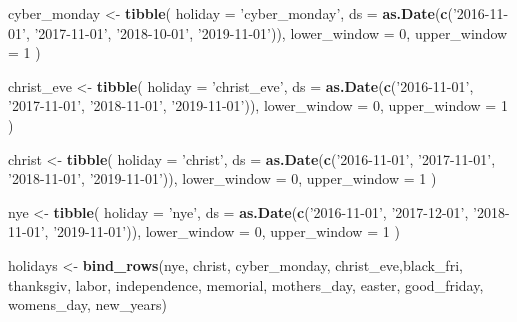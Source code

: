 \documentclass[]{article}
\newenvironment{Shaded}{\begin{snugshade}}{\end{snugshade}}
\newcommand{\KeywordTok}[1]{\textcolor[rgb]{0.13,0.29,0.53}{\textbf{{#1}}}}
\newcommand{\DataTypeTok}[1]{\textcolor[rgb]{0.13,0.29,0.53}{{#1}}}
\newcommand{\DecValTok}[1]{\textcolor[rgb]{0.00,0.00,0.81}{{#1}}}
\newcommand{\StringTok}[1]{\textcolor[rgb]{0.31,0.60,0.02}{{#1}}}
\newcommand{\NormalTok}[1]{{#1}}
\begin{document}
\begin{Shaded}
\begin{Highlighting}[]
\NormalTok{cyber_monday <-}\StringTok{ }\KeywordTok{tibble}\NormalTok{(}
  \DataTypeTok{holiday =} \StringTok{'cyber_monday'}\NormalTok{,}
  \DataTypeTok{ds =} \KeywordTok{as.Date}\NormalTok{(}\KeywordTok{c}\NormalTok{(}\StringTok{'2016-11-01'}\NormalTok{, }\StringTok{'2017-11-01'}\NormalTok{, }\StringTok{'2018-10-01'}\NormalTok{,}
                 \StringTok{'2019-11-01'}\NormalTok{)),}
  \DataTypeTok{lower_window =} \DecValTok{0}\NormalTok{,}
  \DataTypeTok{upper_window =} \DecValTok{1}
\NormalTok{)}

\NormalTok{christ_eve <-}\StringTok{ }\KeywordTok{tibble}\NormalTok{(}
  \DataTypeTok{holiday =} \StringTok{'christ_eve'}\NormalTok{,}
  \DataTypeTok{ds =} \KeywordTok{as.Date}\NormalTok{(}\KeywordTok{c}\NormalTok{(}\StringTok{'2016-11-01'}\NormalTok{, }\StringTok{'2017-11-01'}\NormalTok{, }\StringTok{'2018-11-01'}\NormalTok{,}
                 \StringTok{'2019-11-01'}\NormalTok{)),}
  \DataTypeTok{lower_window =} \DecValTok{0}\NormalTok{,}
  \DataTypeTok{upper_window =} \DecValTok{1}
\NormalTok{)}

\NormalTok{christ <-}\StringTok{ }\KeywordTok{tibble}\NormalTok{(}
  \DataTypeTok{holiday =} \StringTok{'christ'}\NormalTok{,}
  \DataTypeTok{ds =} \KeywordTok{as.Date}\NormalTok{(}\KeywordTok{c}\NormalTok{(}\StringTok{'2016-11-01'}\NormalTok{, }\StringTok{'2017-11-01'}\NormalTok{, }\StringTok{'2018-11-01'}\NormalTok{,}
                 \StringTok{'2019-11-01'}\NormalTok{)),}
  \DataTypeTok{lower_window =} \DecValTok{0}\NormalTok{,}
  \DataTypeTok{upper_window =} \DecValTok{1}
\NormalTok{)}

\NormalTok{nye <-}\StringTok{ }\KeywordTok{tibble}\NormalTok{(}
  \DataTypeTok{holiday =} \StringTok{'nye'}\NormalTok{,}
  \DataTypeTok{ds =} \KeywordTok{as.Date}\NormalTok{(}\KeywordTok{c}\NormalTok{(}\StringTok{'2016-11-01'}\NormalTok{, }\StringTok{'2017-12-01'}\NormalTok{, }\StringTok{'2018-11-01'}\NormalTok{,}
                 \StringTok{'2019-11-01'}\NormalTok{)),}
  \DataTypeTok{lower_window =} \DecValTok{0}\NormalTok{,}
  \DataTypeTok{upper_window =} \DecValTok{1}
\NormalTok{)}






\NormalTok{holidays <-}\StringTok{ }\KeywordTok{bind_rows}\NormalTok{(nye, christ, cyber_monday, christ_eve,black_fri, thanksgiv, labor, independence, memorial, mothers_day, easter, good_friday, womens_day, new_years)}
\end{Highlighting}
\end{Shaded}
\end{document}
